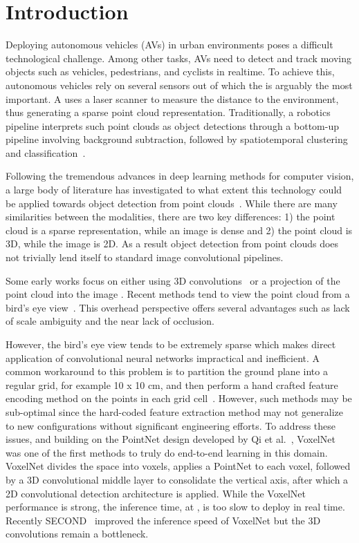 \documentclass[10pt,twocolumn,letterpaper]{article}
\newcommand{\squeeze}{\vspace{-0.5mm}}
\begin{document}
\squeeze
\section{Introduction} \label{sec:intro}
\squeeze

Deploying autonomous vehicles (AVs) in urban environments poses a difficult technological challenge.
Among other tasks, AVs need to detect and track moving objects such as vehicles, pedestrians, and cyclists in realtime.
To achieve this, autonomous vehicles rely on several sensors out of which the \lidar is arguably the most important.
A \lidar uses a laser scanner to measure the distance to the environment, thus generating a sparse point cloud representation.
Traditionally, a \lidar robotics pipeline interprets such point clouds as object detections through a bottom-up pipeline involving background subtraction, followed by spatiotemporal clustering and classification~\cite{classic_lidar,himmelsbach2008lidar}.

Following the tremendous advances in deep learning methods for computer vision,
a large body of literature has investigated to what extent this technology could be applied towards object detection from \lidar point clouds~\cite{voxelnet,hdnet,pixor,avod,mv3d,frustum,contfuse,second,complexyolo,roarnet}.
While there are many similarities between the modalities, there are two key differences:
1) the point cloud is a sparse representation, while an image is dense and
2) the point cloud is 3D, while the image is 2D.
As a result object detection from point clouds does not trivially lend itself to standard image convolutional pipelines.

Some early works focus on either using 3D convolutions~\cite{engelcke2017vote3deep} or a projection of the point cloud into the image \cite{fcl}.
Recent methods tend to view the \lidar point cloud from a bird's eye view~\cite{mv3d, avod, voxelnet, pixor}.
This overhead perspective offers several advantages such as lack of scale ambiguity and the near lack of occlusion.

However, the bird's eye view tends to be extremely sparse which makes direct application of convolutional neural networks impractical and inefficient.
A common workaround to this problem is to partition the ground plane into a regular grid,
for example 10 x 10 cm, and then perform a hand crafted feature encoding method on the points in each grid cell~\cite{mv3d, avod, complexyolo, pixor}.
However, such methods may be sub-optimal since the hard-coded feature extraction method may not generalize to new configurations without significant engineering efforts.
To address these issues, and building on the PointNet design developed by Qi et al.~\cite{pointnet}, VoxelNet~\cite{voxelnet} was one of the first methods to truly do end-to-end learning in this domain.
VoxelNet divides the space into voxels, applies a PointNet to each voxel, followed by a 3D convolutional middle layer to consolidate the vertical axis, after which a 2D convolutional detection architecture is applied.
While the VoxelNet performance is strong, the inference time, at , is too slow to deploy in real time. Recently SECOND~\cite{second} improved the inference speed of VoxelNet but the 3D convolutions remain a bottleneck.
\end{document}
